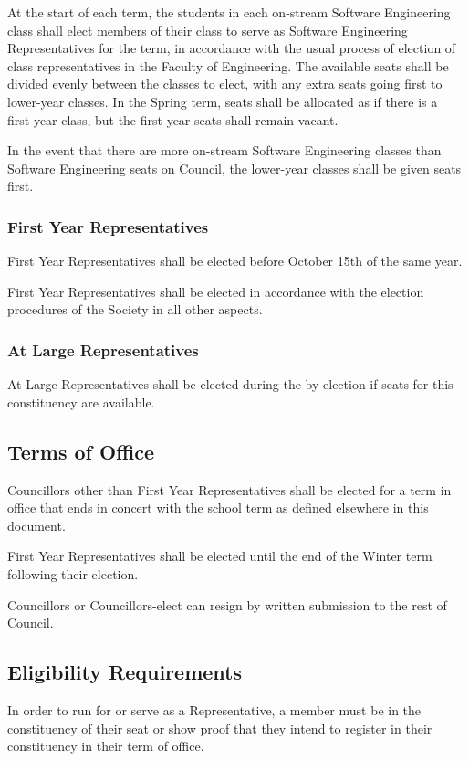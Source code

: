 At the start of each term, the students in each on-stream Software Engineering
class shall elect members of their class to serve as Software Engineering
Representatives for the term, in accordance with the usual process of election
of class representatives in the Faculty of Engineering. The available seats
shall be divided evenly between the classes to elect, with any extra seats going
first to lower-year classes. In the Spring term, seats shall be allocated as if
there is a first-year class, but the first-year seats shall remain vacant.

In the event that there are more on-stream Software Engineering classes than
Software Engineering seats on Council, the lower-year classes shall be given
seats first.

\subsubsection{First Year Representatives}

First Year Representatives shall be elected before October 15th of the same
year. 

First Year Representatives shall be elected in accordance with the election
procedures of the Society in all other aspects.

\subsubsection{At Large Representatives}
At Large Representatives shall be elected during the by-election if seats for this constituency are available. 

\subsection{Terms of Office}
Councillors other than First Year Representatives shall be elected for a term in office that ends in concert with the
school term as defined elsewhere in this document.

First Year Representatives shall be elected until the end of the Winter term following their election.

Councillors or Councillors-elect can resign by written submission to the rest
of Council.

\subsection{Eligibility Requirements}
In order to run for or serve as a Representative, a member must be in the
constituency of their seat or show proof that they intend to register in their
constituency in their term of office.

